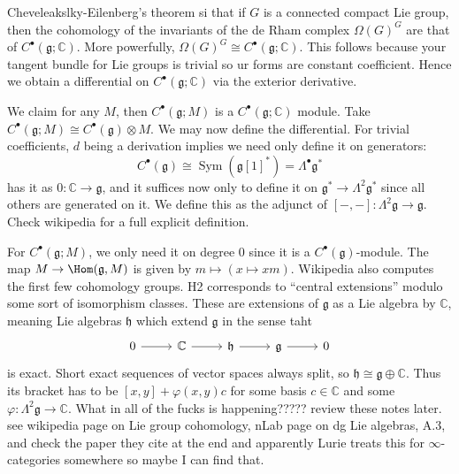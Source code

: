Cheveleakslky-Eilenberg's theorem si that if $G$ is a connected compact Lie group, then the cohomology of the invariants of the de Rham complex $\Omega (G)^G$ are that of $C^{\bullet}(\mathfrak{g} ;\mathbb{C} ) $. More powerfully, $\Omega (G)^G \cong C^{\bullet} (\mathfrak{g} ;\mathbb{C} )$. This follows because your tangent bundle for Lie groups is trivial so ur forms are constant coefficient. Hence we obtain a differential on $C^{\bullet} (\mathfrak{g} ;\mathbb{C} )$ via the exterior derivative.

We claim for any $M$, then $C^{\bullet} (\mathfrak{g} ;M)$ is a $C^{\bullet} (\mathfrak{g};\mathbb{C} )$ module. Take $C^{\bullet} (\mathfrak{g} ;M) \cong C^{\bullet} (\mathfrak{g} )\otimes M$. We may now define the differential. For trivial coefficients, $d$ being a derivation implies we need only define it on generators:
\[
	C^{\bullet} (\mathfrak{g} ) \cong \operatorname{Sym} (\mathfrak{g} [1]^*) = \Lambda ^{\bullet} \mathfrak{g} ^*
\]
has it as $0 : \mathbb{C}  \to \mathfrak{g} $, and it suffices now only to define it on $\mathfrak{g}^* \to \Lambda^2 \mathfrak{g}^* $ since all others are generated on it. We define this as the adjunct of $[-,-]: \Lambda ^2\mathfrak{g}  \to \mathfrak{g} $. Check wikipedia for a full explicit definition.

For $C^{\bullet} (\mathfrak{g} ;M)$, we only need it on degree 0 since it is a $C^{\bullet} (\mathfrak{g} )$-module. The map $M\to \Hom(\mathfrak{g} , M) $ is given by $m\mapsto (x\mapsto xm)$. Wikipedia also computes the first few cohomology groups. H2 corresponds to ``central extensions'' modulo some sort of isomorphism classes. These are extensions of $\mathfrak{g} $ as a Lie algebra by $\mathbb{C} $, meaning Lie algebras $\mathfrak{h} $ which extend $\mathfrak{g} $ in the sense taht
\[\begin{tikzcd}[row sep = 2.5em, column sep = 2.5em]
0\ar[r]  & \mathbb{C} \ar[r]  & \mathfrak{h} \ar[r]  & \mathfrak{g} \ar[r]  & 0
\end{tikzcd}\]
is exact. Short exact sequences of vector spaces always split, so $\mathfrak{h} \cong \mathfrak{g} \oplus \mathbb{C} $. Thus its bracket has to be $[x,y]+\varphi (x,y)c$ for some basis $c\in\mathbb{C} $ and some $\varphi : \Lambda ^2\mathfrak{g}  \to \mathbb{C} $. What in all of the fucks is happening????? review these notes later.  see wikipedia page on Lie group cohomology, nLab page on dg Lie algebras, \cite{cg1} A.3, and check the paper they cite at the end and apparently Lurie treats this for $\infty $-categories somewhere so maybe I can find that.
